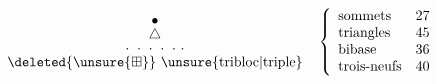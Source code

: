 \[
 \begin{matrix}
 \bullet\\[-2pt]\triangle\\[-2pt]\cdot\ \cdot\ \cdot\ \cdot\ \cdot\ \cdot\\[-2pt]
 \deleted{\unsure{\boxplus}}\ \text{\unsure{tribloc|triple}}
 \end{matrix}
 \quad
 \left\{\begin{array}{lr}
 \text{sommets}&27\\\text{triangles}&45\\\text{bibase}&36\\\text{trois-neufs}&40
 \end{array}\right.
\]
